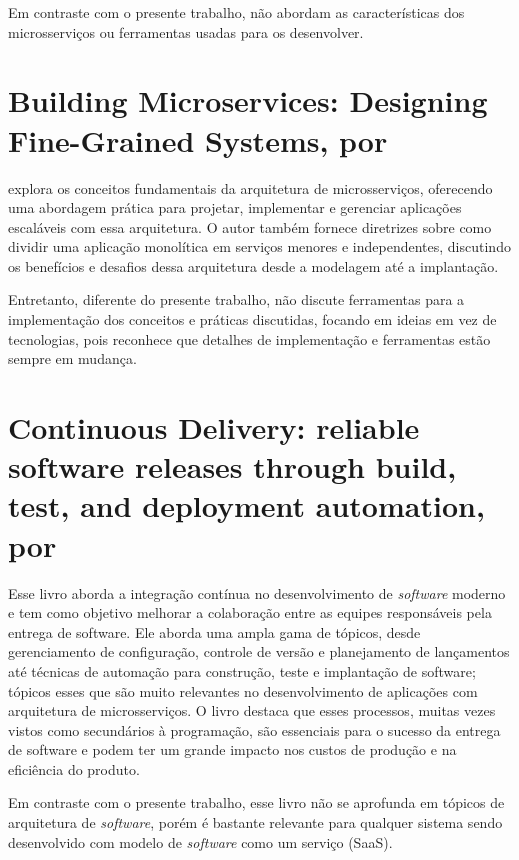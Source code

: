 Em contraste com o presente trabalho,  não abordam as características dos microsserviços ou ferramentas usadas para os desenvolver.

\section{Building Microservices: Designing Fine-Grained Systems, por \texorpdfstring{}{Newman (2015)}}

 explora os conceitos fundamentais da arquitetura de microsserviços, oferecendo uma abordagem prática para projetar, implementar e gerenciar aplicações escaláveis com essa arquitetura. O autor também fornece diretrizes sobre como dividir uma aplicação monolítica em serviços menores e independentes, discutindo os benefícios e desafios dessa arquitetura desde a modelagem até a implantação.

Entretanto, diferente do presente trabalho,  não discute ferramentas para a implementação dos conceitos e práticas discutidas, focando em ideias em vez de tecnologias, pois reconhece que detalhes de implementação e ferramentas estão sempre em mudança.

\section{Continuous Delivery: reliable software releases through build, test, and deployment automation, por \texorpdfstring{}{Humble e Farley (2010)}}
Esse livro aborda a integração contínua no desenvolvimento de \emph{software} moderno e tem como objetivo melhorar a colaboração entre as equipes responsáveis pela entrega de software. Ele aborda uma ampla gama de tópicos, desde gerenciamento de configuração, controle de versão e planejamento de lançamentos até técnicas de automação para construção, teste e implantação de software; tópicos esses que são muito relevantes no desenvolvimento de aplicações com arquitetura de microsserviços. O livro destaca que esses processos, muitas vezes vistos como secundários à programação, são essenciais para o sucesso da entrega de software e podem ter um grande impacto nos custos de produção e na eficiência do produto.

Em contraste com o presente trabalho, esse livro não se aprofunda em tópicos de arquitetura de \emph{software}, porém é bastante relevante para qualquer sistema sendo desenvolvido com modelo de \emph{software} como um serviço (SaaS).

